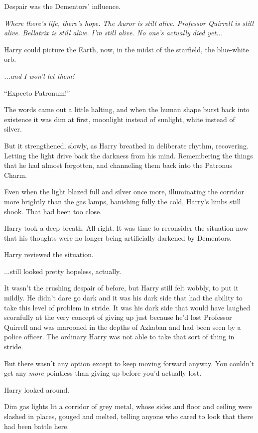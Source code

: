 Despair was the Dementors' influence.

\emph{Where there's life, there's hope. The Auror is still alive.
Professor Quirrell is still alive. Bellatrix is still alive. I'm still
alive. No one's actually died yet...}

Harry could picture the Earth, now, in the midst of the starfield, the
blue-white orb.

\emph{...and I won't let them!}

``Expecto Patronum!''

The words came out a little halting, and when the human shape burst back
into existence it was dim at first, moonlight instead of sunlight, white
instead of silver.

But it strengthened, slowly, as Harry breathed in deliberate rhythm,
recovering. Letting the light drive back the darkness from his mind.
Remembering the things that he had almost forgotten, and channeling them
back into the Patronus Charm.

Even when the light blazed full and silver once more, illuminating the
corridor more brightly than the gas lamps, banishing fully the cold,
Harry's limbs still shook. That had been too close.

Harry took a deep breath. All right. It was time to reconsider the
situation now that his thoughts were no longer being artificially
darkened by Dementors.

Harry reviewed the situation.

...still looked pretty hopeless, actually.

It wasn't the crushing despair of before, but Harry still felt wobbly,
to put it mildly. He didn't dare go dark and it was his dark side that
had the ability to take this level of problem in stride. It was his dark
side that would have laughed scornfully at the very concept of giving up
just because he'd lost Professor Quirrell and was marooned in the depths
of Azkaban and had been seen by a police officer. The ordinary Harry was
not able to take that sort of thing in stride.

But there wasn't any option except to keep moving forward anyway. You
couldn't get any \emph{more} pointless than giving up before you'd
actually lost.

Harry looked around.

Dim gas lights lit a corridor of grey metal, whose sides and floor and
ceiling were slashed in places, gouged and melted, telling anyone who
cared to look that there had been battle here.

